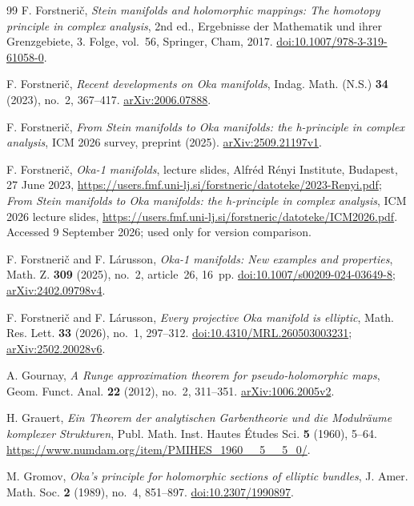 \documentclass[12pt]{amsart}
\theoremstyle{definition}
\theoremstyle{remark}
\numberwithin{equation}{section}
\begin{document}
\begin{thebibliography}{99}
F. Forstneri\v c,
\emph{Stein manifolds and holomorphic mappings: The homotopy principle in complex analysis},
2nd ed., Ergebnisse der Mathematik und ihrer Grenzgebiete, 3. Folge, vol.~56,
Springer, Cham, 2017.
\href{https://doi.org/10.1007/978-3-319-61058-0}{doi:10.1007/978-3-319-61058-0}.

F. Forstneri\v c, \emph{Recent developments on Oka manifolds},
Indag. Math. (N.S.) \textbf{34} (2023), no.~2, 367--417.
\href{https://arxiv.org/abs/2006.07888}{arXiv:2006.07888}.

F. Forstneri\v c,
\emph{From Stein manifolds to Oka manifolds: the h-principle in complex analysis},
ICM 2026 survey, preprint (2025).
\href{https://arxiv.org/abs/2509.21197v1}{arXiv:2509.21197v1}.

F. Forstneri\v c, \emph{Oka-1 manifolds}, lecture slides,
Alfr\'ed R\'enyi Institute, Budapest, 27 June 2023,
\url{https://users.fmf.uni-lj.si/forstneric/datoteke/2023-Renyi.pdf};
\emph{From Stein manifolds to Oka manifolds: the h-principle in complex analysis},
ICM 2026 lecture slides,
\url{https://users.fmf.uni-lj.si/forstneric/datoteke/ICM2026.pdf}.
Accessed 9 September 2026; used only for version comparison.

F. Forstneri\v c and F. L\'arusson,
\emph{Oka-1 manifolds: New examples and properties},
Math. Z. \textbf{309} (2025), no.~2, article~26, 16~pp.
\href{https://doi.org/10.1007/s00209-024-03649-8}{doi:10.1007/s00209-024-03649-8};
\href{https://arxiv.org/abs/2402.09798v4}{arXiv:2402.09798v4}.

F. Forstneri\v c and F. L\'arusson,
\emph{Every projective Oka manifold is elliptic},
Math. Res. Lett. \textbf{33} (2026), no.~1, 297--312.
\href{https://doi.org/10.4310/MRL.260503003231}{doi:10.4310/MRL.260503003231};
\href{https://arxiv.org/abs/2502.20028v6}{arXiv:2502.20028v6}.

A. Gournay, \emph{A Runge approximation theorem for pseudo-holomorphic maps},
Geom. Funct. Anal. \textbf{22} (2012), no.~2, 311--351.
\href{https://arxiv.org/abs/1006.2005v2}{arXiv:1006.2005v2}.

H. Grauert,
\emph{Ein Theorem der analytischen Garbentheorie und die Modulr\"aume komplexer Strukturen},
Publ. Math. Inst. Hautes \'Etudes Sci. \textbf{5} (1960), 5--64.
\url{https://www.numdam.org/item/PMIHES_1960__5__5_0/}.

M. Gromov, \emph{Oka's principle for holomorphic sections of elliptic bundles},
J. Amer. Math. Soc. \textbf{2} (1989), no.~4, 851--897.
\href{https://doi.org/10.2307/1990897}{doi:10.2307/1990897}.


\end{thebibliography}
\end{document}
